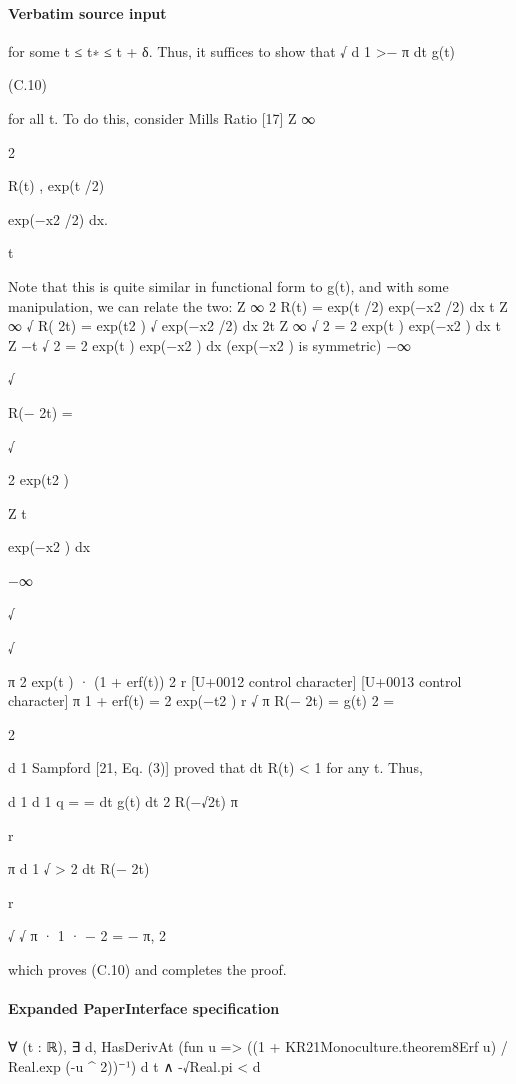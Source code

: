 \documentclass[10pt]{article}
\begin{document}
\paragraph{Verbatim source input}
\begin{ReviewVerbatim}
for some t ≤ t∗ ≤ t + δ. Thus, it suffices to show that
√
d 1
>− π
dt g(t)

(C.10)

for all t. To do this, consider Mills Ratio [17]
Z ∞

2

R(t) , exp(t /2)

exp(−x2 /2) dx.

t

Note that this is quite similar in functional form to g(t), and with some manipulation, we can relate the two:
Z ∞
2
R(t) = exp(t /2)
exp(−x2 /2) dx
t
Z ∞
√
R( 2t) = exp(t2 ) √ exp(−x2 /2) dx
2t
Z ∞
√
2
= 2 exp(t )
exp(−x2 ) dx
t
Z −t
√
2
= 2 exp(t )
exp(−x2 ) dx
(exp(−x2 ) is symmetric)
−∞

√

R(− 2t) =

√

2 exp(t2 )

Z t

exp(−x2 ) dx

−∞

√

√

π
2 exp(t ) ·
(1 + erf(t))
2
r [U+0012 control character]
[U+0013 control character]
π 1 + erf(t)
=
2 exp(−t2 )
r
√
π
R(− 2t) =
g(t)
2
=

2

d 1
Sampford [21, Eq. (3)] proved that dt
R(t) < 1 for any t. Thus,

d 1
d
1
q
=
=
dt g(t)
dt 2 R(−√2t)
π

r

π d
1
√
>
2 dt R(− 2t)

r

√
√
π
· 1 · − 2 = − π,
2

which proves (C.10) and completes the proof.
\end{ReviewVerbatim}


\paragraph{Expanded PaperInterface specification}
\begin{ReviewVerbatim}
∀ (t : ℝ), ∃ d, HasDerivAt (fun u => ((1 + KR21Monoculture.theorem8Erf u) / Real.exp (-u ^ 2))⁻¹) d t ∧ -√Real.pi < d
\end{ReviewVerbatim}
\end{document}
